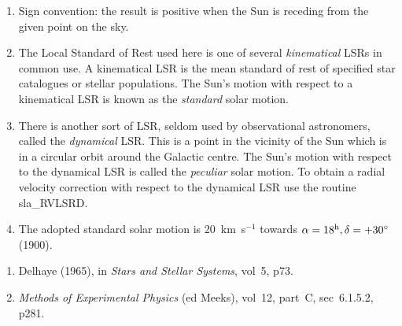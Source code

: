 {
 \begin{enumerate}
  \item Sign convention: the result is positive when
        the Sun is receding from the given point on the sky.
  \item The Local Standard of Rest used here is one of several
        {\it kinematical}\/ LSRs in common use.  A kinematical LSR is the
        mean standard of rest of specified star catalogues or stellar
        populations.  The Sun's motion with respect to a kinematical
        LSR is known as the {\it standard}\/ solar motion.
  \item There is another sort of LSR, seldom used by observational
        astronomers, called the {\it dynamical}\/ LSR.  This is a
        point in the vicinity of the Sun which is in a circular orbit
        around the Galactic centre.  The Sun's motion with respect to
        the dynamical LSR is called the {\it peculiar}\/ solar motion.  To
        obtain a radial velocity correction with respect to the
        dynamical LSR use the routine sla\_RVLSRD.
  \item The adopted standard solar motion is 20~km~s$^{-1}$
        towards $\alpha=18^{\rm h},\delta=+30^{\circ}$ (1900).
 \end{enumerate}
{
 \begin{enumerate}
  \item Delhaye (1965), in {\it Stars and Stellar Systems}, vol~5, p73.
  \item {\it Methods of Experimental Physics}\/ (ed Meeks), vol~12,
        part~C, sec~6.1.5.2, p281.
 \end{enumerate}
}
}
{
}
{
  \\
}
{
  \\
  \\
  \\
  \\
  \\
}
